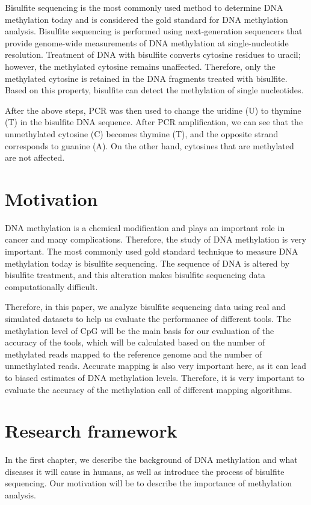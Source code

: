 \documentclass{PHlab-thesis}
\begin{document}
\par 
Bisulfite sequencing is the most commonly used method to determine DNA methylation today and is considered the gold standard for DNA methylation analysis. Bisulfite sequencing is performed using next-generation sequencers that provide genome-wide measurements of DNA methylation at single-nucleotide resolution. Treatment of DNA with bisulfite converts cytosine residues to uracil; however, the methylated cytosine remains unaffected. Therefore, only the methylated cytosine is retained in the DNA fragments treated with bisulfite. Based on this property, bisulfite can detect the methylation of single nucleotides.

\par 
After the above steps, PCR was then used to change the uridine (U) to thymine (T) in the bisulfite DNA sequence. After PCR amplification, we can see that the unmethylated cytosine (C) becomes thymine (T), and the opposite strand corresponds to guanine (A). On the other hand, cytosines that are methylated are not affected.

\section{Motivation}
DNA methylation is a chemical modification and plays an important role in cancer and many complications. Therefore, the study of DNA methylation is very important. The most commonly used gold standard technique to measure DNA methylation today is bisulfite sequencing. The sequence of DNA is altered by bisulfite treatment, and this alteration makes bisulfite sequencing data computationally difficult.

\par 
Therefore, in this paper, we analyze bisulfite sequencing data using real and simulated datasets to help us evaluate the performance of different tools. The methylation level of CpG will be the main basis for our evaluation of the accuracy of the tools, which will be calculated based on the number of methylated reads mapped to the reference genome and the number of unmethylated reads. Accurate mapping is also very important here, as it can lead to biased estimates of DNA methylation levels. Therefore, it is very important to evaluate the accuracy of the methylation call of different mapping algorithms.

\section{Research framework}
In the first chapter, we describe the background of DNA methylation and what diseases it will cause in humans, as well as introduce the process of bisulfite sequencing. Our motivation will be to describe the importance of methylation analysis.
\end{document}
